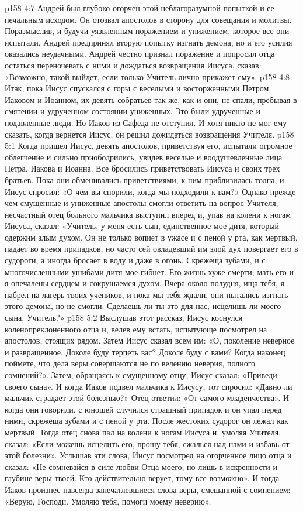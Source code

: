 \vs p158 4:7 Андрей был глубоко огорчен этой неблагоразумной попыткой и ее печальным исходом. Он отозвал апостолов в сторону для совещания и молитвы. Поразмыслив, и будучи уязвленным поражением и унижением, которое все они испытали, Андрей предпринял вторую попытку изгнать демона, но и его усилия оказались неудачными. Андрей честно признал поражение и попросил отца остаться переночевать с ними и дождаться возвращения Иисуса, сказав: «Возможно, такой выйдет, если только Учитель лично прикажет ему».
\vs p158 4:8 Итак, пока Иисус спускался с горы с веселыми и восторженными Петром, Иаковом и Иоанном, их девять собратьев так же, как и они, не спали, пребывая в смятении и удрученном состоянии униженных. Это были удрученные и подавленные люди. Но Иаков из Сафеда не отступил. И хотя никто не мог ему сказать, когда вернется Иисус, он решил дожидаться возвращения Учителя.
\vs p158 5:1 Когда пришел Иисус, девять апостолов, приветствуя его, испытали огромное облегчение и сильно приободрились, увидев веселые и воодушевленные лица Петра, Иакова и Иоанна. Все бросились приветствовать Иисуса и своих трех братьев. Пока они обменивались приветствиями, к ним приблизилась толпа, и Иисус спросил: «О чем вы спорили, когда мы подходили к вам?» Однако прежде чем смущенные и униженные апостолы смогли ответить на вопрос Учителя, несчастный отец больного мальчика выступил вперед и, упав на колени к ногам Иисуса, сказал: «Учитель, у меня есть сын, единственное мое дитя, который одержим злым духом. Он не только вопиет в ужасе и с пеной у рта, как мертвый, падает во время припадков, но часто сей овладевший им злой дух повергает его в судороги, а иногда бросает в воду и даже в огонь. Скрежеща зубами, и с многочисленными ушибами дитя мое гибнет. Его жизнь хуже смерти; мать его и я опечалены сердцем и сокрушаемся духом. Вчера около полудня, ища тебя, я набрел на лагерь твоих учеников, и пока мы тебя ждали, они пытались изгнать этого демона, но не смогли. Сделаешь ли ты это для нас, исцелишь ли моего сына, Учитель?»
\vs p158 5:2 Выслушав этот рассказ, Иисус коснулся коленопреклоненного отца и, велев ему встать, испытующе посмотрел на апостолов, стоящих рядом. Затем Иисус сказал всем им: «О, поколение неверное и развращенное. Доколе буду терпеть вас? Доколе буду с вами? Когда наконец поймете, что дела веры совершаются не по велению неверия, полного сомнений?». Затем, обращаясь к смущенному отцу, Иисус сказал: «Приведи своего сына». И когда Иаков подвел мальчика к Иисусу, тот спросил: «Давно ли мальчик страдает этой болезнью?» Отец ответил: «От самого младенчества». И когда они говорили, с юношей случился страшный припадок и он упал перед ними, скрежеща зубами и с пеной у рта. После жестоких судорог он лежал как мертвый. Тогда отец снова пал на колени к ногам Иисуса и, умоляя Учителя, сказал: «Если можешь исцелить его, прошу тебя, сжалься над нами и избавь от этой болезни». Услышав эти слова, Иисус посмотрел на огорченное лицо отца и сказал: «Не сомневайся в силе любви Отца моего, но лишь в искренности и глубине веры твоей. Кто действительно верует, тому все возможно». И тогда Иаков произнес навсегда запечатлевшиеся слова веры, смешанной с сомнением: «Верую, Господи. Умоляю тебя, помоги моему неверию».
